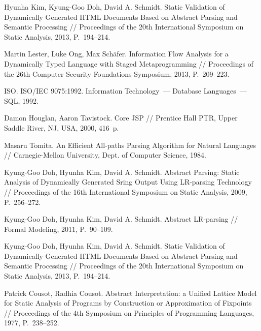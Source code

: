\documentclass{llncs}
\begin{document}
\begin{thebibliography}{}
Hyunha Kim, Kyung-Goo Doh, David A. Schmidt.
Static Validation of Dynamically Generated HTML Documents Based on Abstract Parsing and Semantic Processing //
Proceedings of the 20th International Symposium on Static Analysis, 2013, P.~194--214.

Martin Lester, Luke Ong, Max Sch{\"{a}}fer.
Information Flow Analysis for a Dynamically Typed Language with Staged Metaprogramming //
Proceedings of the 26th Computer Security Foundations Symposium, 2013, P.~209--223.

ISO. ISO/IEC 9075:1992. Information Technology~--- Database Languages~--- SQL, 1992.

Damon Houglan, Aaron Tavistock. Core JSP // Prentice Hall PTR, Upper Saddle River, NJ, USA, 2000, 416~p.

Masaru Tomita.
An Efficient All-paths Parsing Algorithm for Natural Languages //
Carnegie-Mellon University, Dept. of Computer Science, 1984.

Kyung-Goo Doh, Hyunha Kim, David A. Schmidt. Abstract Parsing: Static Analysis of 
Dynamically Generated Sring Output Using LR-parsing Technology // 
Proceedings of the 16th International Symposium on Static Analysis, 2009, P.~256--272.

Kyung-Goo Doh, Hyunha Kim, David A. Schmidt. Abstract LR-parsing // Formal Modeling, 2011, P.~90--109.

Kyung-Goo Doh, Hyunha Kim, David A. Schmidt. Static Validation of Dynamically Generated HTML 
Documents Based on Abstract Parsing and Semantic Processing // 
Proceedings of the 20th International Symposium on Static Analysis, 2013, P.~194--214.

Patrick Cousot, Radhia Cousot. Abstract Interpretation: a Unified Lattice Model for Static Analysis 
of Programs by Construction or Approximation of Fixpoints // Proceedings of the 4th Symposium on Principles of Programming Languages, 1977, P.~238--252.

\end{thebibliography}
\end{document}
